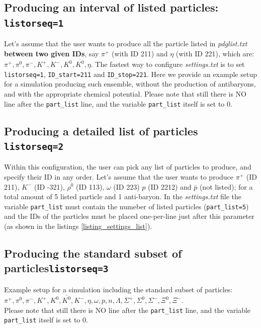 \subsection{Producing an interval of listed particles: {\tt listorseq=1}}

Let's assume that the user wants to produce all the particle listed in \textit{pdglist.txt} \textbf{between two given IDs}, say $\pi^+$ (with ID 211) and $\eta$ (with ID 221), 
which are: $\pi^+, \pi^0, \pi^-, K^+, K^-, K^0, \overline{K^0}, \eta$.
The fastest way to configure \textit{settings.txt} is to set {\tt listorseq=1}, 
{\tt ID\_start=211} and {\tt ID\_stop=221}.
Here we provide an example setup for a simulation producing such ensemble, without the production of antibaryons, and with the appropriate chemical potential.
Please note that still there is NO line after the {\tt part\_list} line, and the 
variable {\tt part\_list} itself is set to 0.\\



\subsection{Producing a detailed list of particles {\tt listorseq=2}}
Within this configuration, the user can pick any list of particles to produce, and specify their ID in any order. Let's assume that the user wants to produce 
$\pi^+$ (ID 211), 
$K^-$ (ID -321), 
$\rho^0$ (ID 113), 
$\omega$ (ID 223)
 $p$ (ID 2212) and $\bar{p}$ (not listed); for a total amount of 5 
 listed particle and 1 anti-baryon.
In the \textit{settings.txt} file the variable {\tt part\_list} must contain the numeber of listed particles ({\tt part\_list=5}) and the IDs of the particles must be placed one-per-line just after this parameter (as shown in the listings \ref{listing_settings_list}).





\subsection{Producing the standard subset of particles{\tt listorseq=3}}
Example setup for a simulation including the standard subset of particles:
$\pi^+,\pi^0,\pi^-,K^+,K^0,\bar{K^0},K^-,\eta,\omega, p, n, \Lambda, \Sigma^+, \Sigma^0, \Sigma^-, \Xi^0, \Xi^-$.\\
Please note that still there is NO line after the {\tt part\_list} line, and the 
variable {\tt part\_list} itself is set to 0.\\







